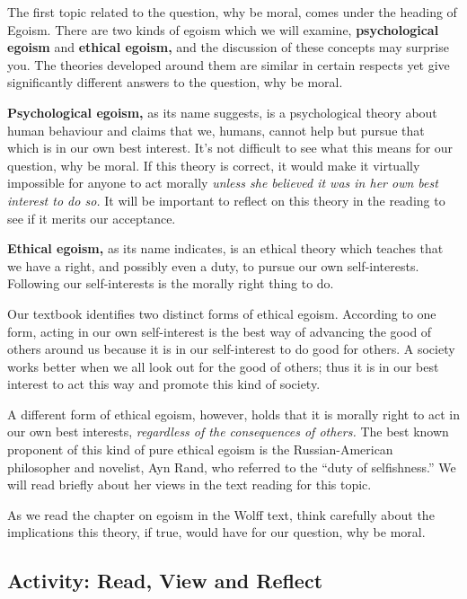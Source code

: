 \documentclass[
]{book}
\begin{document}
The first topic related to the question, why be moral, comes under the heading of Egoism. There are two kinds of egoism which we will examine, \textbf{psychological egoism} and \textbf{ethical egoism,} and the discussion of these concepts may surprise you. The theories developed around them are similar in certain respects yet give significantly different answers to the question, why be moral.

\textbf{Psychological egoism,} as its name suggests, is a psychological theory about human behaviour and claims that we, humans, cannot help but pursue that which is in our own best interest. It's not difficult to see what this means for our question, why be moral. If this theory is correct, it would make it virtually impossible for anyone to act morally \emph{unless she believed it was in her own best interest to do so.} It will be important to reflect on this theory in the reading to see if it merits our acceptance.

\textbf{Ethical egoism,} as its name indicates, is an ethical theory which teaches that we have a right, and possibly even a duty, to pursue our own self-interests. Following our self-interests is the morally right thing to do.

Our textbook identifies two distinct forms of ethical egoism. According to one form, acting in our own self-interest is the best way of advancing the good of others around us because it is in our self-interest to do good for others. A society works better when we all look out for the good of others; thus it is in our best interest to act this way and promote this kind of society.

A different form of ethical egoism, however, holds that it is morally right to act in our own best interests, \emph{regardless of the consequences of others.} The best known proponent of this kind of pure ethical egoism is the Russian-American philosopher and novelist, Ayn Rand, who referred to the ``duty of selfishness.'' We will read briefly about her views in the text reading for this topic.

As we read the chapter on egoism in the Wolff text, think carefully about the implications this theory, if true, would have for our question, why be moral.

\hypertarget{activity-read-view-and-reflect-1}{%
\subsection*{Activity: Read, View and Reflect}\label{activity-read-view-and-reflect-1}}
\end{document}
